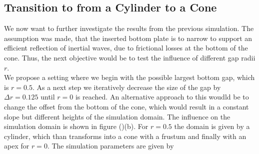 \subsection{Transition to from a Cylinder to a Cone}

We now want to further investigate the results from the previous simulation.
The assumption was made, that the inserted bottom plate is to narrow to support an efficient reflection
of inertial waves, due to frictional losses at the bottom of the cone. Thus, the next objective would be to
test the influence of different gap radii $r$.\\
We propose a setting where we begin with the possible largest bottom gap, which is $r=0.5$.
As a next step we iteratively decrease the size of the gap by $\Delta r = 0.125$ until $r=0$ is reached.
An alternative approach to this woudld be to change the offset from the bottom of the cone, which would result in a constant
slope but different heights of the simulation domain.
The influence on the simulation domain is shown in figure ()(b).
For $r=0.5$ the domain is given by a cylinder, which than transforms into a cone with a frustum and finally with an apex for $r=0$.
The simulation parameters are given by

